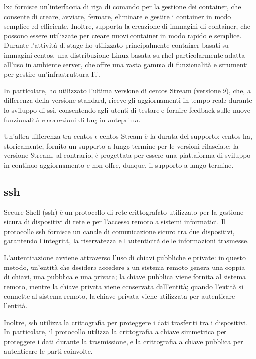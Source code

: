 \acrshort{lxc} fornisce un'interfaccia di riga di comando per la gestione dei container, che consente di creare, avviare, fermare, eliminare e gestire i container in modo semplice ed efficiente. Inoltre, supporta la creazione di immagini di container, che possono essere utilizzate per creare nuovi container in modo rapido e semplice.
\\
Durante l'attività di stage ho utilizzato principalmente container basati su immagini \acrfull{centos}, una distribuzione Linux basata su \acrfull{rhel} particolarmente adatta all'uso in ambiente server, che offre una vasta gamma di funzionalità e strumenti per gestire un'infrastruttura IT. 

In particolare, ho utilizzato l'ultima versione di \acrshort{centos} Stream (versione 9), che, a differenza della versione standard, riceve gli aggiornamenti in tempo reale durante lo sviluppo di \acrshort{ssi}, consentendo agli utenti di testare e fornire feedback sulle nuove funzionalità e correzioni di bug in anteprima.

Un'altra differenza tra \acrshort{centos} e \acrshort{centos} Stream è la durata del supporto: \acrshort{centos} ha, storicamente, fornito un supporto a lungo termine per le versioni rilasciate; la versione Stream, al contrario, è progettata per essere una piattaforma di sviluppo in continuo aggiornamento e non offre, dunque, il supporto a lungo termine.

\subsection{\acrlong{ssh}}
Secure Shell (\acrshort{ssh}) è un protocollo di rete crittografato utilizzato per la gestione sicura di dispositivi di rete e per l'accesso remoto a sistemi informatici. Il protocollo \acrshort{ssh} fornisce un canale di comunicazione sicuro tra due dispositivi, garantendo l'integrità, la riservatezza e l'autenticità delle informazioni trasmesse.

L'autenticazione avviene attraverso l'uso di chiavi pubbliche e private: in questo metodo, un'entità che desidera accedere a un sistema remoto genera una coppia di chiavi, una pubblica e una privata; la chiave pubblica viene fornita al sistema remoto, mentre la chiave privata viene conservata dall'entità; quando l'entità si connette al sistema remoto, la chiave privata viene utilizzata per autenticare l'entità.

Inoltre, \acrshort{ssh} utilizza la crittografia per proteggere i dati trasferiti tra i dispositivi. In particolare, il protocollo utilizza la crittografia a chiave simmetrica per proteggere i dati durante la trasmissione, e la crittografia a chiave pubblica per autenticare le parti coinvolte.

